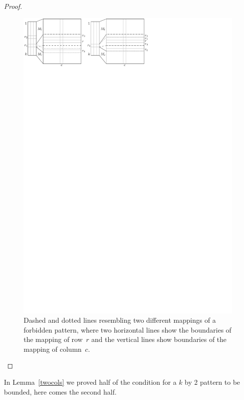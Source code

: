 \begin{proof}
\begin{figure}[!ht]
\centering
\includegraphics[width=\textwidth]{img/emptymid.pdf}
\caption{Dashed and dotted lines resembling two different mappings of a forbidden pattern, where two horizontal lines show the boundaries of the mapping of row~$r$ and the vertical lines show boundaries of the mapping of column~$c$.}
\label{emptyMidFig}
\end{figure}
\end{proof}

In Lemma~\ref{twocols} we proved half of the condition for a $k$ by 2 pattern to be bounded, here comes the second half.

